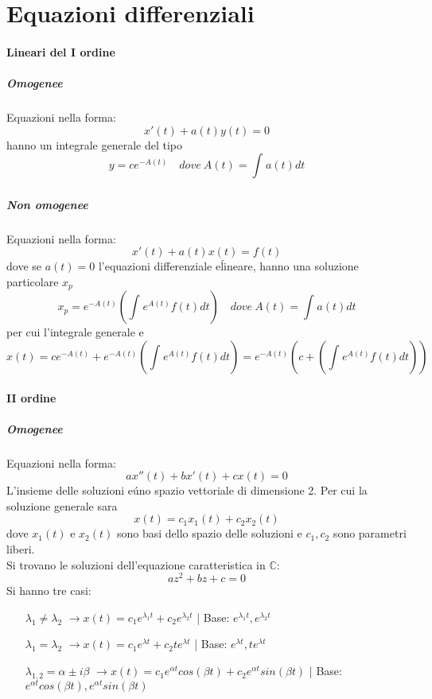 \documentclass[a4paper, titlepage]{report}%
\theoremstyle{definition} %
\theoremstyle{plain}
\theoremstyle{plain}
\theoremstyle{remark}
\theoremstyle{remark}
\theoremstyle{plain}
\theoremstyle{plain}
\theoremstyle{plain}
\theoremstyle{plain}
\theoremstyle{plain}
\begin{document}
\section*{Equazioni differenziali}

\paragraph*{Lineari del I ordine}
     \subparagraph*{Omogenee}
Equazioni nella forma:
     \[
          x'(t) + a(t)y(t) = 0  
     \]
hanno un integrale generale del tipo 
\[
      y = ce^{-A(t)}   \quad dove \ A(t) = \int_{}^{}a(t)dt    
\]

    
     \subparagraph*{Non omogenee}
Equazioni nella forma:
\[
     x'(t) + a(t)x(t) =  f(t) 
\]
dove se $a(t) = 0$ l'equazioni differenziale e\' lineare, hanno una
soluzione particolare $x_p$
\[
       x_p = e^{-A(t)}(\int_{}^{}e^{A(t)}f(t)dt)
       \quad dove \ A(t) = \int_{}^{}a(t)dt
\]
per cui l'integrale generale e\'
\[
    x(t)= ce^{-A(t)} + e^{-A(t)}(\int_{}^{}e^{A(t)}f(t)dt) =
    e^{-A(t)}(c + (\int_{}^{}e^{A(t)}f(t)dt))
\]










\paragraph*{II ordine}
\subparagraph*{Omogenee}
Equazioni nella forma:
\[
     ax''(t) + bx'(t) + cx(t)= 0
\]
L'insieme delle soluzioni e\' uno spazio vettoriale di dimensione
2. Per cui la soluzione generale sara\'
\[
     x(t)= c_1 x_1(t) + c_2x_2(t)    
\]
dove $x_1(t)$ e $x_2(t)$ sono basi dello spazio delle soluzioni e 
$c_1,c_2$ sono parametri liberi. \\
Si trovano le soluzioni dell'equazione caratteristica in $\mathbb{C}$:
\[
     az^2 + bz +c = 0    
\]
Si hanno tre casi:
\begin{enumerate}
    \item[$\lambda_1 \neq \lambda_2$] 
    $\rightarrow x(t)= c_1e^{\lambda_1 t}+ c_2e^{\lambda_2 t}$ |
    Base: $e^{\lambda_1 t},e^{\lambda_2 t}$
    \item[$\lambda_1 = \lambda_2$] 
    $\rightarrow x(t)= c_1e^{\lambda t}+ c_2te^{\lambda t}$ |
    Base: $e^{\lambda t}, te^{\lambda t}$
    \item[$\lambda_{1,2} = \alpha \pm i\beta$] 
    $\rightarrow x(t)= c_1e^{\alpha t}cos(\beta t)+ c_2
    e^{\alpha t}sin(\beta t)$ |
    Base: $e^{\alpha t}cos(\beta t),e^{\alpha t}sin(\beta t)$ 
\end{enumerate}
\end{document}
